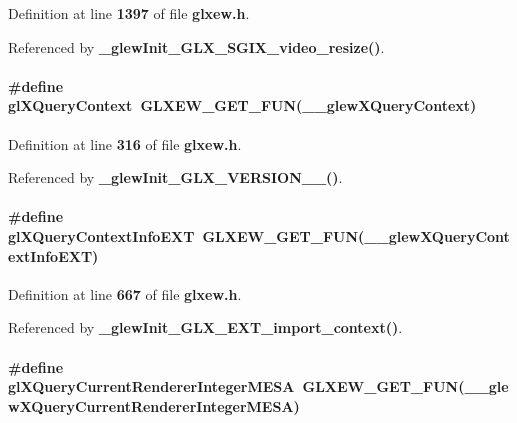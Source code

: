 Definition at line {\bf 1397} of file {\bf glxew.\+h}.



Referenced by {\bf \+\_\+glew\+Init\+\_\+\+G\+L\+X\+\_\+\+S\+G\+I\+X\+\_\+video\+\_\+resize()}.

\paragraph[{gl\+X\+Query\+Context}]{\setlength{\rightskip}{0pt plus 5cm}\#define gl\+X\+Query\+Context~{\bf G\+L\+X\+E\+W\+\_\+\+G\+E\+T\+\_\+\+F\+UN}({\bf \+\_\+\+\_\+glew\+X\+Query\+Context})}\label{glxew_8h_ac265a1c7421d748026b4e8e62a8868de}


Definition at line {\bf 316} of file {\bf glxew.\+h}.



Referenced by {\bf \+\_\+glew\+Init\+\_\+\+G\+L\+X\+\_\+\+V\+E\+R\+S\+I\+O\+N\+\_\+\_()}.

\paragraph[{gl\+X\+Query\+Context\+Info\+E\+XT}]{\setlength{\rightskip}{0pt plus 5cm}\#define gl\+X\+Query\+Context\+Info\+E\+XT~{\bf G\+L\+X\+E\+W\+\_\+\+G\+E\+T\+\_\+\+F\+UN}({\bf \+\_\+\+\_\+glew\+X\+Query\+Context\+Info\+E\+XT})}\label{glxew_8h_a8077988dd2e5345d0046d60b77144694}


Definition at line {\bf 667} of file {\bf glxew.\+h}.



Referenced by {\bf \+\_\+glew\+Init\+\_\+\+G\+L\+X\+\_\+\+E\+X\+T\+\_\+import\+\_\+context()}.

\paragraph[{gl\+X\+Query\+Current\+Renderer\+Integer\+M\+E\+SA}]{\setlength{\rightskip}{0pt plus 5cm}\#define gl\+X\+Query\+Current\+Renderer\+Integer\+M\+E\+SA~{\bf G\+L\+X\+E\+W\+\_\+\+G\+E\+T\+\_\+\+F\+UN}({\bf \+\_\+\+\_\+glew\+X\+Query\+Current\+Renderer\+Integer\+M\+E\+SA})}\label{glxew_8h_a1a84bdf23d906e178558b304e826de77}


